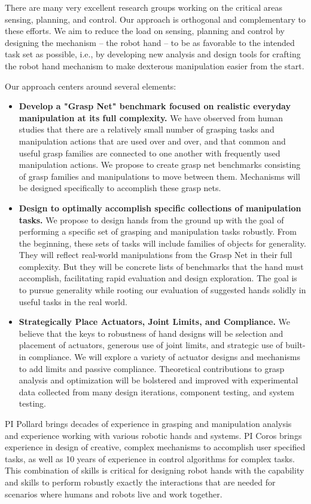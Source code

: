 There are many very excellent research groups working on the critical areas sensing, planning, and control.   Our approach is orthogonal and complementary to these efforts.    We aim to reduce the load on sensing, planning and control by designing the mechanism -- the robot hand -- to be as favorable to the intended task set as possible, i.e., by developing new analysis and design tools for crafting the robot hand mechanism to make dexterous manipulation easier from the start.

Our approach centers around several elements:
\begin{itemize}
  \item {\bf Develop a "Grasp Net" benchmark focused on realistic everyday manipulation at its full complexity.}   We have observed from human studies that there are a relatively small number of grasping tasks and manipulation actions that are used over and over, and that common and useful grasp families are connected to one another with frequently used manipulation actions.   We propose to create grasp net benchmarks consisting of grasp families and manipulations to move between them.   Mechanisms will be designed specifically to accomplish these grasp nets.
	
\item {\bf Design to optimally accomplish specific collections of manipulation tasks.}   We propose to design hands from the ground up with the goal of performing a specific set of grasping and manipulation tasks robustly.    From the beginning, these sets of tasks will include families of objects for generality.   They will reflect real-world manipulations from the Grasp Net in their full complexity.   But they will be concrete lists of benchmarks that the hand must accomplish, facilitating rapid evaluation and design exploration.   The goal is to pursue generality while rooting our evaluation of suggested hands solidly in useful tasks in the real world.

\item {\bf Strategically Place Actuators, Joint Limits, and Compliance.}  We believe that the keys to robustness of hand designs will be selection and placement of actuators, generous use of joint limits, and strategic use of built-in compliance.    We will explore a variety of actuator designs and mechanisms to add limits and passive compliance.    Theoretical contributions to grasp analysis and optimization will be bolstered and improved with experimental data collected from many design iterations, component testing, and system testing. 

\end{itemize}	
	
PI Pollard brings decades of experience in grasping and manipulation analysis and experience working with various robotic hands and systems.   PI Coros brings experience in design of creative, complex mechanisms to accomplish user specified tasks, as well as 10 years of experience in control algorithms for complex tasks.     This combination of skills is critical for designing robot hands with the capability and skills to perform robustly exactly the interactions that are needed for scenarios where humans and robots live and work together.

